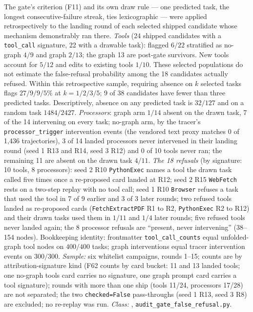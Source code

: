 \begin{description}[leftmargin=0pt,labelindent=0pt,labelsep=0pt,style=nextline,font=\normalfont,itemsep=6pt]
\item[\textbf{F71}\quad Sixth-gate criterion stress test on selected shipped candidates.]
The gate's criterion (F11) and its own draw rule --- one predicted task,
the longest consecutive-failure streak, ties lexicographic --- were applied
retrospectively to the landing round of each selected shipped candidate whose
mechanism demonstrably ran there. \emph{Tools} (24 shipped candidates with a
\texttt{tool\_call} signature, 22 with a drawable task): flagged $6/22$
stratified as no-graph $4/9$ and graph $2/13$; the
graph 13 are post-gate survivors. New tools account for $5/12$ and edits to
existing tools $1/10$. These selected populations do not estimate the
false-refusal probability among the 18 candidates actually refused. Within
this retrospective sample, requiring absence on $k$ selected tasks flags
$27/9/9/5\%$ at $k=1/2/3/5$; 9 of 38 candidates have fewer than three
predicted tasks. Descriptively, absence on any predicted task is $32/127$ and
on a random task $1484/2427$. \emph{Processors}:
graph arm $1/14$ absent on the drawn task, 7 of the 14 intervening on every
task; no-graph arm, by the tracer's \texttt{processor\_trigger} intervention
events (the vendored text proxy matches 0 of 1,436 trajectories), 3 of 14
landed processors never intervened in their landing round (seed 1 R13 and
R14, seed 3 R12) and 0 of 10 tools never ran; the remaining 11 are absent
on the drawn task $4/11$. \emph{The 18 refusals} (by signature: 10 tools,
8 processors): seed 2 R10 \texttt{PythonExec} names a tool the drawn task
called five times once a re-proposed card landed at R12; seed 2 R15
\texttt{WebFetch} rests on a two-step replay with no tool call; seed 1 R10
\texttt{Browser} refuses a task that used the tool in 7 of 9 earlier and 3
of 3 later rounds; two refused tools landed as re-proposed cards
(\texttt{FetchExtractPDF} R1 to R2, \texttt{PythonExec} R2 to R12) and
their drawn tasks used them in $1/11$ and $1/4$ later rounds; five refused
tools never landed again; the 8 processor refusals are ``present, never
intervening'' (38--154 nodes). Bookkeeping identity: frontmatter
\texttt{tool\_call\_counts} equal unfolded-graph tool nodes on $400/400$
tasks; graph interventions equal tracer intervention events on $300/300$.
\emph{Sample:} six whitelist campaigns, rounds 1--15; counts are by
attribution-signature kind (F62 counts by card bucket: 11 and 13 landed
tools; one no-graph tools card carries no signature, one graph prompt card
carries a tool signature); rounds with more than one ship (tools 11/24,
processors 17/28) are not separated; the two \texttt{checked=False}
pass-throughs (seed 1 R13, seed 3 R8) are excluded; no re-replay was run.
\emph{Class:} , \texttt{audit\_gate\_false\_refusal.py}.

\end{description}

